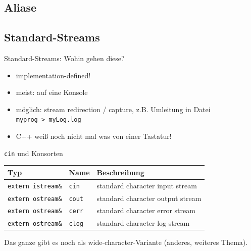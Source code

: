 \subsection{Aliase}



\subsection{Standard-Streams}

\begin{frame}{Standard-Streams: Wohin gehen diese?}
	\begin{itemize}
		\item implementation-defined!
		\item meist: auf eine Konsole
		\item möglich: stream redirection / capture, z.B. Umleitung in Datei \texttt{myprog~>~myLog.log}
		\item C++ weiß noch nicht mal was von einer Tastatur!
	\end{itemize}
\end{frame}

\begin{frame}{\texttt{cin} und Konsorten}
	\begin{tabular}{l|l|l}
		\textbf{Typ}	&	\textbf{Name}	& \textbf{Beschreibung}	\\
		\hline
		\texttt{extern istream\&}	&	\texttt{cin}	&	standard character input stream	\\
		\texttt{extern ostream\&}	&	\texttt{cout}	&	standard character output stream	\\
		\texttt{extern ostream\&}	&	\texttt{cerr}	&	standard character error stream	\\
		\texttt{extern ostream\&}	&	\texttt{clog}	&	standard character log stream	\\
	\end{tabular}
	
	\vspace{2em}
	
	Das ganze gibt es noch als wide-character-Variante (anderes, weiteres Thema).
\end{frame}
